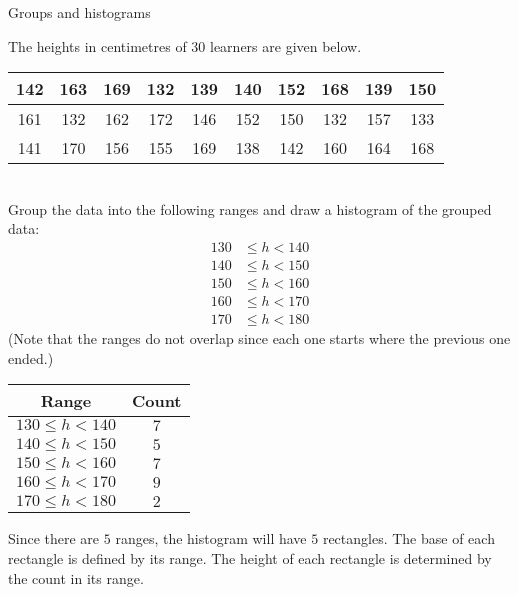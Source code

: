\begin{wex}{Groups and histograms}
{The heights in centimetres of $30$ learners are given below.
\\
    \begin{center}
      \begin{tabular}{|c|c|c|c|c|c|c|c|c|c|}\hline
   
        142 & 163 & 169 & 132 & 139 & 140 & 152 & 168 & 139 & 150\\ \hline
        161 & 132 & 162 & 172 & 146 & 152 & 150 & 132 & 157 & 133\\ \hline
        141 & 170 & 156 & 155 & 169 & 138 & 142 & 160 & 164 & 168\\\hline
 
      \end{tabular}
    \end{center}
\vspace {8pt}\\
    Group the data into the following ranges and draw a histogram of the
    grouped data:
    \begin{align*}
      130 &\leq h < 140 \\
      140 &\leq h < 150 \\
      150 &\leq h < 160 \\
      160 &\leq h < 170 \\
      170 &\leq h < 180
    \end{align*}
    (Note that the ranges do not overlap since each one starts where
    the previous one ended.)
}{
  \begin{center}
    \begin{tabular}{|c|c|} \hline

      \textbf{Range} & \textbf{Count} \\ \hline
    
      $130 \leq h < 140$ & $7$ \\ \hline
      $140 \leq h < 150$ & $5$ \\\hline
      $150 \leq h < 160$ & $7$ \\\hline
      $160 \leq h < 170$ & $9$ \\\hline
      $170 \leq h < 180$ & $2$ \\\hline

    \end{tabular}
  \end{center}
  

  Since there are $5$ ranges, the histogram will have $5$
  rectangles. The base of each rectangle is defined by its range. The
  height of each rectangle is determined by the count in its range.
  
}
\end{wex}
